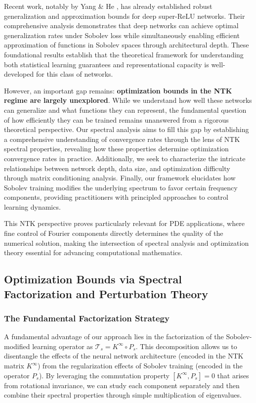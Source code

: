 \documentclass{article}
\begin{document}
Recent work, notably by Yang \& He \cite{yang2021deeper}, has already established robust generalization and approximation bounds for deep super-ReLU networks. Their comprehensive analysis demonstrates that deep networks can achieve optimal generalization rates under Sobolev loss while simultaneously enabling efficient approximation of functions in Sobolev spaces through architectural depth. These foundational results establish that the theoretical framework for understanding both statistical learning guarantees and representational capacity is well-developed for this class of networks.

However, an important gap remains: \textbf{optimization bounds in the NTK regime are largely unexplored}. While we understand how well these networks can generalize and what functions they can represent, the fundamental question of how efficiently they can be trained remains unanswered from a rigorous theoretical perspective. Our spectral analysis aims to fill this gap by establishing a comprehensive understanding of convergence rates through the lens of NTK spectral properties, revealing how these properties determine optimization convergence rates in practice. Additionally, we seek to characterize the intricate relationships between network depth, data size, and optimization difficulty through matrix conditioning analysis. Finally, our framework elucidates how Sobolev training modifies the underlying spectrum to favor certain frequency components, providing practitioners with principled approaches to control learning dynamics.

This NTK perspective proves particularly relevant for PDE applications, where fine control of Fourier components directly determines the quality of the numerical solution, making the intersection of spectral analysis and optimization theory essential for advancing computational mathematics.

\subsection{Optimization Bounds via Spectral Factorization and Perturbation Theory}

\subsubsection{The Fundamental Factorization Strategy}

A fundamental advantage of our approach lies in the factorization of the Sobolev-modified learning operator as $\mathcal{T}_s = K^{\infty} \circ P_s$. This decomposition allows us to disentangle the effects of the neural network architecture (encoded in the NTK matrix $K^{\infty}$) from the regularization effects of Sobolev training (encoded in the operator $P_s$). By leveraging the commutation property $[K^{\infty}, P_s] = 0$ that arises from rotational invariance, we can study each component separately and then combine their spectral properties through simple multiplication of eigenvalues.
\end{document}
